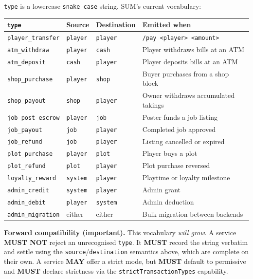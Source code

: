 \documentclass[11pt,a4paper]{article}
\newcommand{\code}[1]{\texttt{\small #1}}
\newcommand{\req}{\textbf{MUST}}
\newcommand{\opt}{\textbf{MAY}}
\newcommand{\keybox}[2]{%
  \par\vspace{0.5em}\noindent
  \colorbox{#1}{%
    \begin{minipage}{\dimexpr\linewidth-2\fboxsep\relax}
    \vspace{0.35em}\small #2\vspace{0.35em}
    \end{minipage}}%
  \par\vspace{0.5em}}
\newcommand{\warn}[1]{\keybox{omceWarnWash}{#1}}
\begin{document}
\code{type} is a lowercase \code{snake\_case} string. SUM's current vocabulary:

\begin{tabularx}{\linewidth}{L{4.0cm} L{1.9cm} L{2.1cm} X}
\toprule
\code{type} & \textbf{Source} & \textbf{Destination} & \textbf{Emitted when}\\
\midrule
\code{player\_transfer}  & \code{player} & \code{player} & \code{/pay <player> <amount>}\\
\code{atm\_withdraw}     & \code{player} & \code{cash}   & Player withdraws bills at an ATM\\
\code{atm\_deposit}      & \code{cash}   & \code{player} & Player deposits bills at an ATM\\
\code{shop\_purchase}    & \code{player} & \code{shop}   & Buyer purchases from a shop block\\
\code{shop\_payout}      & \code{shop}   & \code{player} & Owner withdraws accumulated takings\\
\code{job\_post\_escrow} & \code{player} & \code{job}    & Poster funds a job listing\\
\code{job\_payout}       & \code{job}    & \code{player} & Completed job approved\\
\code{job\_refund}       & \code{job}    & \code{player} & Listing cancelled or expired\\
\code{plot\_purchase}    & \code{player} & \code{plot}   & Player buys a plot\\
\code{plot\_refund}      & \code{plot}   & \code{player} & Plot purchase reversed\\
\code{loyalty\_reward}   & \code{system} & \code{player} & Playtime or loyalty milestone\\
\code{admin\_credit}     & \code{system} & \code{player} & Admin grant\\
\code{admin\_debit}      & \code{player} & \code{system} & Admin deduction\\
\code{admin\_migration}  & either        & either        & Bulk migration between backends\\
\bottomrule
\end{tabularx}

\warn{\textbf{Forward compatibility (important).} This vocabulary \emph{will grow}. A service
\textbf{MUST NOT} reject an unrecognised \code{type}. It \req{} record the string verbatim and
settle using the \code{source}/\code{destination} semantics above, which are complete on their own.
A service \opt{} offer a strict mode, but \req{} default to permissive and \req{} declare
strictness via the \code{strictTransactionTypes} capability.}
\end{document}
